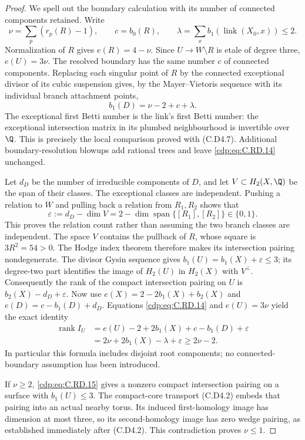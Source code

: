 \begin{proof}
We spell out the boundary calculation with its number
of connected components retained. Write
\[
 \nu=\sum_p(r_p(R)-1),\qquad
 c=b_0(R),\qquad
 \lambda=\sum_x b_1(\operatorname{link}(X_0,x))\le2.
\]
Normalization of $R$ gives $e(R)=4-\nu$.
Since $U\to W\setminus R$ is etale of degree three,
$e(U)=3\nu$. The resolved boundary has the same
number $c$ of connected components. Replacing each
singular point of $R$ by the connected exceptional
divisor of its cubic suspension gives, by the
Mayer--Vietoris sequence with its individual branch
attachment points,
\[
                 b_1(D)=\nu-2+c+\lambda.
\tag{C.RD.14}\label{cdp:eq:C.RD.14}
\]
The exceptional first Betti number is the link's
first Betti number: the exceptional intersection
matrix in its plumbed neighbourhood is invertible
over $\Q$. This is precisely the local comparison
proved with (C.D4.7). Additional boundary-resolution
blowups add rational trees and leave \eqref{cdp:eq:C.RD.14}
unchanged.

Let $d_D$ be the number of irreducible components
of $D$, and let $V\subset H_2(X,\Q)$ be the span
of their classes. The exceptional classes are
independent. Pushing a relation to $W$ and pulling
back a relation from $R_1,R_2$ shows that
\[
 \varepsilon:=d_D-\dim V
      =2-\dim\operatorname{span}\{[R_1],[R_2]\}
      \in\{0,1\}.
\]
This proves the relation count rather than
assuming the two branch classes are independent.
The space $V$ contains the pullback of $R$,
whose square is $3R^2=54>0$. The Hodge index
theorem therefore makes its intersection pairing
nondegenerate. The divisor Gysin sequence gives
$b_1(U)=b_1(X)+\varepsilon\le3$; its degree-two
part identifies the image of $H_2(U)$ in
$H_2(X)$ with $V^\perp$. Consequently the rank
of the compact intersection pairing on $U$ is
$b_2(X)-d_D+\varepsilon$.
Now use $e(X)=2-2b_1(X)+b_2(X)$ and
$e(D)=c-b_1(D)+d_D$. Equations \eqref{cdp:eq:C.RD.14} and
$e(U)=3\nu$ yield the exact identity
\[
\begin{split}
 \operatorname{rank}I_U
   &=e(U)-2+2b_1(X)+c-b_1(D)+\varepsilon\\
   &=2\nu+2b_1(X)-\lambda+\varepsilon
     \ge2\nu-2.
\end{split}
\tag{C.RD.15}\label{cdp:eq:C.RD.15}
\]
In particular this formula includes disjoint root
components; no connected-boundary assumption has
been introduced.

If $\nu\ge2$, \eqref{cdp:eq:C.RD.15} gives a nonzero compact
intersection pairing on a surface with $b_1(U)\le3$.
The compact-core transport (C.D4.2) embeds that
pairing into an actual nearby torus. Its induced
first-homology image has dimension at most three,
so its second-homology image has zero wedge pairing,
as established immediately after (C.D4.2). This
contradiction proves $\nu\le1$.


\end{proof}
